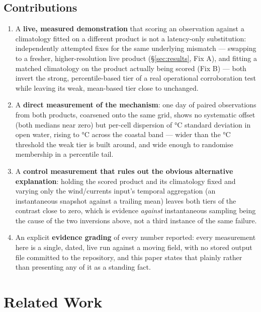 \subsection{Contributions}

\begin{enumerate}\itemsep2pt
\item A \textbf{live, measured demonstration} that scoring an observation
against a climatology fitted on a different product is not a
latency-only substitution: \NCrossProductFixes{} independently attempted fixes
for the same underlying mismatch --- swapping to a fresher, higher-resolution live product
(\S\ref{sec:results}, Fix A), and fitting a matched climatology on the
product actually being scored (Fix B) --- both invert the strong,
percentile-based tier of a real operational corroboration test while leaving
its weak, mean-based tier close to unchanged.
\item A \textbf{direct measurement of the mechanism}: one day of paired
observations from both products, coarsened onto the same grid, shows no
systematic offset (both medians near zero) but per-cell dispersion of
\DisagOpenSD{}\si{\celsius} standard deviation in open water, rising to
\DisagCoastalSD{}\si{\celsius} across the coastal band --- wider than the
\CoolAnomalyThreshold{}\si{\celsius} threshold the weak tier is built around,
and wide enough to randomise membership in a percentile tail.
\item A \textbf{control measurement that rules out the obvious alternative
explanation}: holding the scored product and its climatology fixed and
varying only the wind/currents input's temporal aggregation (an instantaneous
snapshot against a trailing mean) leaves both tiers of the contrast close to
zero, which is evidence \emph{against} instantaneous sampling being the cause
of the two inversions above, not a third instance of the same failure.
\item An explicit \textbf{evidence grading} of every number reported: every
measurement here is a single, dated, live run against a moving field, with no
stored output file committed to the repository, and this paper states that
plainly rather than presenting any of it as a standing fact.
\end{enumerate}

\section{Related Work}
\label{sec:related}

